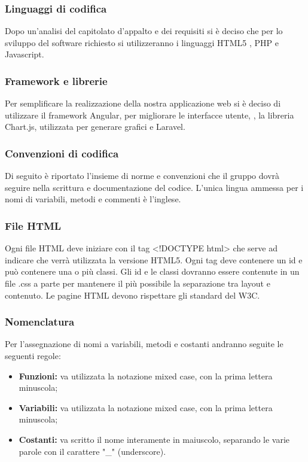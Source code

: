 \subsubsection{Linguaggi di codifica}
Dopo un'analisi del capitolato d'appalto e dei requisiti si è deciso che per lo sviluppo del software richiesto si utilizzeranno i linguaggi \gls{HTML5} , \gls{PHP} e \gls{Javascript}.

\subsubsection{Framework e librerie}
Per semplificare la realizzazione della nostra applicazione web si è deciso di utilizzare il \gls{framework} \gls{Angular}, per migliorare le interfacce utente, , la libreria \gls{Chart.js}, utilizzata per generare grafici e Laravel.

\subsubsection{Convenzioni di codifica}
Di seguito è riportato l'insieme di norme e convenzioni che il gruppo dovrà seguire nella scrittura e documentazione del codice.
L'unica lingua ammessa per i nomi di variabili, metodi e commenti è l'inglese.

\subsubsection{File HTML}

Ogni file \gls{HTML} deve iniziare con il tag <!DOCTYPE html> che serve ad indicare che verrà utilizzata la versione \gls{HTML5}.
Ogni tag deve contenere un id e può contenere una o più classi.
Gli id e le classi dovranno essere contenute in un file .css a parte per mantenere il più possibile la separazione tra \gls{layout} e contenuto.
Le pagine \gls{HTML} devono rispettare gli standard del \gls{W3C}.

\subsubsection{Nomenclatura}
Per l'assegnazione di nomi a variabili, metodi e costanti andranno seguite le seguenti regole:
\begin{itemize}
	\item \textbf{Funzioni:} va utilizzata la notazione mixed case, con la prima lettera minuscola;
	\item \textbf{Variabili:} va utilizzata la notazione mixed case, con la prima lettera minuscola;
	\item \textbf{Costanti:} va scritto il nome interamente in maiuscolo, separando le varie parole con il carattere "\_" (underscore).
\end{itemize}

